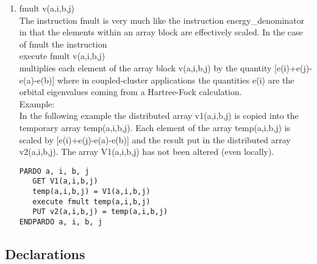 \documentclass[12pt]{article}
\begin{document}
\begin{enumerate}
\item fmult v(a,i,b,j)\\ 
The instruction fmult is very much like the instruction energy\_denominator in that 
the elements within an array block are effectively scaled. In the case of fmult the 
instruction\\ 
execute fmult v(a,i,b,j)\\ 
multiplies each element of the array block v(a,i,b,j) by the quantity 
[e(i)+e(j)-e(a)-e(b)] where in coupled-cluster applications the quantities e(i) are 
the orbital eigenvalues coming from a Hartree-Fock calculation.\\ 
Example:\\ 
In the following example the distributed array v1(a,i,b,j) is copied into the 
temporary array temp(a,i,b,j). Each element of the array temp(a,i,b,j) is scaled 
by [e(i)+e(j)-e(a)-e(b)] and the result put in the distributed array v2(a,i,b,j). 
The array V1(a,i,b,j) has not been altered (even locally).\\ 
\begin{verbatim}
PARDO a, i, b, j
   GET V1(a,i,b,j)
   temp(a,i,b,j) = V1(a,i,b,j)
   execute fmult temp(a,i,b,j)
   PUT v2(a,i,b,j) = temp(a,i,b,j)
ENDPARDO a, i, b, j
\end{verbatim}

\end{enumerate} 



\subsection{Declarations} 
\end{document}
